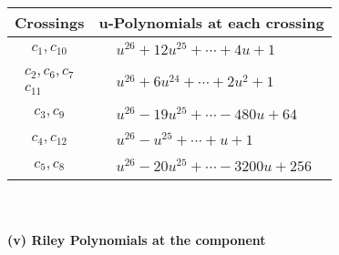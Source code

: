 \documentclass[1p]{elsarticle_modified}
\theoremstyle{definition}
\begin{document}
\begin{tabular}{m{50pt}|m{274pt}}
Crossings & \hspace{64pt}u-Polynomials at each crossing \\
\hline $$\begin{aligned}c_{1},c_{10}\end{aligned}$$&$\begin{aligned}
&u^{26}+12 u^{25}+\cdots+4 u+1
\end{aligned}$\\
\hline $$\begin{aligned}c_{2},c_{6},c_{7}\\c_{11}\end{aligned}$$&$\begin{aligned}
&u^{26}+6 u^{24}+\cdots+2 u^2+1
\end{aligned}$\\
\hline $$\begin{aligned}c_{3},c_{9}\end{aligned}$$&$\begin{aligned}
&u^{26}-19 u^{25}+\cdots-480 u+64
\end{aligned}$\\
\hline $$\begin{aligned}c_{4},c_{12}\end{aligned}$$&$\begin{aligned}
&u^{26}- u^{25}+\cdots+u+1
\end{aligned}$\\
\hline $$\begin{aligned}c_{5},c_{8}\end{aligned}$$&$\begin{aligned}
&u^{26}-20 u^{25}+\cdots-3200 u+256
\end{aligned}$\\
\hline
\end{tabular}\\~\\
\newpage\renewcommand{\arraystretch}{1}
\flushleft \textbf{(v) Riley Polynomials at the component}\newline \\
\end{document}
